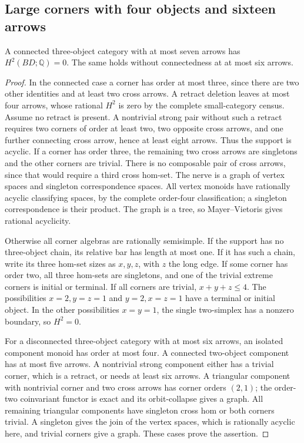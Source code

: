 \subsection{Large corners with four objects and sixteen arrows}

\begin{lemma}\label{C:three-small-H2-zero}
A connected three-object category with at most seven arrows has
$H^2(BD;\mathbb Q)=0$. The same holds without connectedness at
at most six arrows.
\end{lemma}
\begin{proof}
In the connected case a corner has order at most three, since
there are two other identities and at least two cross arrows.
A retract deletion leaves at most four arrows, whose rational
$H^2$ is zero by the complete small-category census. Assume
no retract is present. A nontrivial strong pair without
such a retract requires two corners of order at least two,
two opposite cross arrows, and one further connecting cross
arrow, hence at least eight arrows. Thus the support is acyclic.
If a corner has order three, the remaining two cross arrows
are singletons and the other corners are trivial. There is
no composable pair of cross arrows, since that would require
a third cross hom-set. The nerve is a graph of vertex spaces
and singleton correspondence spaces. All vertex monoids have
rationally acyclic classifying spaces, by the complete order-four
classification; a singleton correspondence is their product.
The graph is a tree, so Mayer--Vietoris gives rational acyclicity.

Otherwise all corner algebras are rationally semisimple. If the
support has no three-object chain, its relative bar has length
at most one. If it has such a chain, write its three hom-set
sizes as $x,y,z$, with $z$ the long edge. If some corner has
order two, all three hom-sets are singletons, and one of the
trivial extreme corners is initial or terminal. If all corners
are trivial, $x+y+z\leq4$. The possibilities $x=2,y=z=1$
and $y=2,x=z=1$ have a terminal or initial object. In the other
possibilities $x=y=1$, the single two-simplex has a nonzero
boundary, so $H^2=0$.

For a disconnected three-object category with at most six
arrows, an isolated component monoid has order at most four.
A connected two-object component has at most five arrows. A nontrivial strong component either has a trivial
corner, which is a retract, or needs at least six arrows.
A triangular component with nontrivial corner and two cross
arrows has corner orders $(2,1)$; the order-two coinvariant
functor is exact and its orbit-collapse gives a graph.
All remaining triangular components have singleton cross hom
or both corners trivial. A singleton gives the join of the
vertex spaces, which is rationally acyclic here, and trivial
corners give a graph. These cases prove the assertion.
\end{proof}

